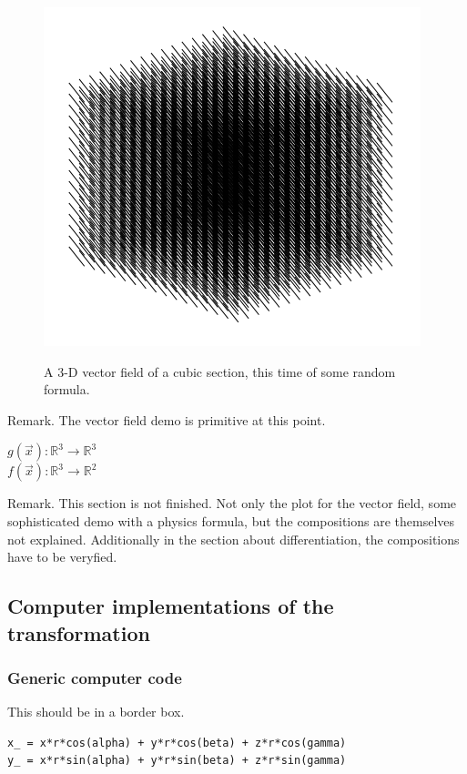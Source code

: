 \documentclass[a4paper]{article}
\begin{document}
\begin{figure}
\includegraphics[scale=0.5]{vectorfield.png}
\label{vector_field_image}
\caption{A 3-D vector field of a cubic section, this time of some random formula.}
\end{figure}

Remark. The vector field demo is primitive at this point.

\begin{center}
$g(\vec{x}) : \mathbb{R}^{3} \rightarrow \mathbb{R}^{3}$\\
$f(\vec{x}) : \mathbb{R}^{3} \rightarrow \mathbb{R}^{2}$\\
\end{center}


Remark. This section is not finished. Not only the plot for the vector field, some sophisticated demo with a physics formula, but the compositions are themselves not explained. Additionally in the section about differentiation, the compositions have to be veryfied.\\


\subsection{Computer implementations of the transformation}
\subsubsection{Generic computer code}

This should be in a border box.

\begin{example}
\begin{lstlisting}
x_ = x*r*cos(alpha) + y*r*cos(beta) + z*r*cos(gamma)
y_ = x*r*sin(alpha) + y*r*sin(beta) + z*r*sin(gamma)
\end{lstlisting}\\

\end{example}\\
\end{document}
